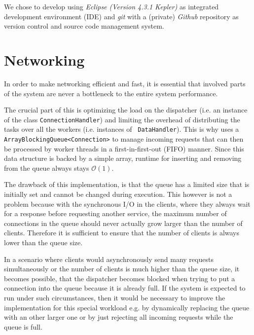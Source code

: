 \documentclass[a4paper, oneside]{csthesis}
\begin{document}
We chose to develop \telesto{} using {\it Eclipse (Version 4.3.1
Kepler)}
as integrated development environment (IDE) and {\it
git}
with a (private) {\it Github} repository as version control
and source code management system.


\section{Networking}
    In order to make networking efficient and fast, it is essential that
    involved parts of the system are never a bottleneck to the entire system
    performance.
    
    The crucial part of this is optimizing the load on the dispatcher (i.e. an
    instance of the class {\tt ConnectionHandler}) and limiting the overhead of
    distributing the tasks over all the workers (i.e. instances of {\tt
    DataHandler}).
    This is why \telesto{} uses a {\tt ArrayBlockingQueue<Connection>} to manage incoming requests that can then be
    processed by worker threads in a first-in-first-out (FIFO) manner. Since
    this data structure is backed by a simple array, runtime for inserting and
    removing from the queue always stays $\mathcal{O}(1)$.
    
    The drawback of this implementation, is that the queue has a limited size
    that is initially set and cannot be changed during execution.
    This however is not a problem because with the synchronous I/O in the
    clients, where they always wait for a response before requesting another
    service, the maximum number of connections in the queue should never
    actually grow larger than the number of clients. Therefore it is sufficient
    to ensure that the number of clients is always lower than the queue size.
    
    In a scenario where clients would asynchronously send many requests
    simultaneously or the number of clients is much higher than the queue size,
    it becomes possible, that the dispatcher becomes blocked when trying to put
    a connection into the queue because it is already full. If the system is
    expected to run under such circumstances, then it would be necessary to
    improve the implementation for this special workload e.g. by dynamically
    replacing the queue with an other larger one or by just rejecting all
    incoming requests while the queue is full.
    
\end{document}
